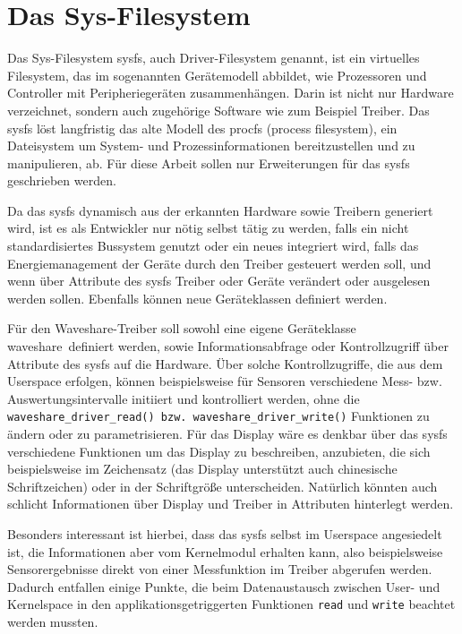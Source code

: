 \section{Das Sys-Filesystem} %
Das Sys-Filesystem sysfs, auch Driver-Filesystem genannt, ist ein virtuelles Filesystem, das im sogenannten Gerätemodell abbildet, wie Prozessoren und Controller mit Peripheriegeräten zusammenhängen. Darin ist nicht nur Hardware verzeichnet, sondern auch zugehörige Software wie zum Beispiel Treiber. Das sysfs löst langfristig das alte Modell des procfs (process filesystem), ein Dateisystem um System- und Prozessinformationen bereitzustellen und zu manipulieren, ab. Für diese Arbeit sollen nur Erweiterungen für das sysfs geschrieben werden. 

Da das sysfs dynamisch aus der erkannten Hardware sowie Treibern generiert wird, ist es als Entwickler nur nötig selbst tätig zu werden, falls ein nicht standardisiertes Bussystem genutzt oder ein neues integriert wird, falls das Energiemanagement der Geräte durch den Treiber gesteuert werden soll, und wenn über Attribute des sysfs Treiber oder Geräte verändert oder ausgelesen werden sollen. Ebenfalls können neue Geräteklassen definiert werden. 

Für den Waveshare-Treiber soll sowohl eine eigene Geräteklasse \glqq waveshare\grqq~definiert werden, sowie Informationsabfrage oder Kontrollzugriff über Attribute des sysfs auf die Hardware. Über solche Kontrollzugriffe, die aus dem Userspace erfolgen, können beispielsweise für Sensoren verschiedene Mess- bzw. Auswertungsintervalle initiiert und kontrolliert werden, ohne die \texttt{waveshare_driver_read() bzw. waveshare_driver_write()} Funktionen zu ändern oder zu parametrisieren. Für das Display wäre es denkbar über das sysfs verschiedene Funktionen um das Display zu beschreiben, anzubieten, die sich beispielsweise im Zeichensatz (das Display unterstützt auch chinesische Schriftzeichen) oder in der Schriftgröße unterscheiden. Natürlich könnten auch schlicht Informationen über Display und Treiber in Attributen hinterlegt werden. 

Besonders interessant ist hierbei, dass das sysfs selbst im Userspace angesiedelt ist, die Informationen aber vom Kernelmodul erhalten kann, also beispielsweise Sensorergebnisse direkt von einer Messfunktion im Treiber abgerufen werden. Dadurch entfallen einige Punkte, die beim Datenaustausch zwischen User- und Kernelspace in den applikationsgetriggerten Funktionen \texttt{read} und \texttt{write} beachtet werden mussten.

